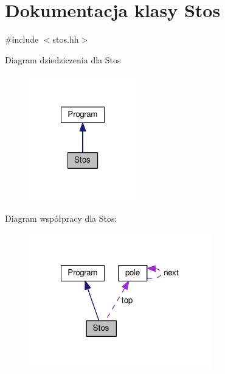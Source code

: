 \hypertarget{class_stos}{\section{Dokumentacja klasy Stos}
\label{class_stos}
}


{\ttfamily \#include $<$stos.\-hh$>$}



Diagram dziedziczenia dla Stos\nopagebreak
\begin{figure}[H]
\begin{center}
\leavevmode
\includegraphics[width=132pt]{class_stos__inherit__graph}
\end{center}
\end{figure}


Diagram współpracy dla Stos\-:\nopagebreak
\begin{figure}[H]
\begin{center}
\leavevmode
\includegraphics[width=225pt]{class_stos__coll__graph}
\end{center}
\end{figure}
